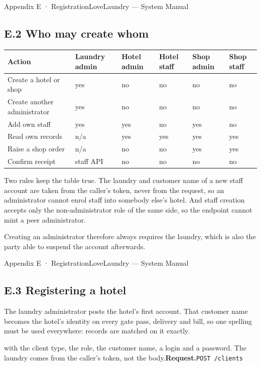 \documentclass[11pt,a4paper,oneside]{book}
\begin{document}
Appendix E · RegistrationLoveLaundry — System Manual

\subsection*{E.2 Who may create whom}
\begin{center}\small
\begin{tabularx}{\linewidth}{|X|X|X|X|X|X|}
\hline
\rowcolor{lightgrey}
\textbf{Action} & \textbf{Laundry admin} & \textbf{Hotel admin} & \textbf{Hotel staff} & \textbf{Shop admin} & \textbf{Shop staff} \\ \hline
Create a hotel or shop & yes & no & no & no & no \\ \hline
Create another administrator & yes & no & no & no & no \\ \hline
Add own staff & yes & yes & no & yes & no \\ \hline
Read own records & n/a & yes & yes & yes & yes \\ \hline
Raise a shop order & n/a & no & no & yes & yes \\ \hline
Confirm receipt & staff API & no & no & no & no \\ \hline
\end{tabularx}
\end{center}
Two rules keep the table true. The laundry and customer name of a new staff account are taken from the caller’s token, never from the request, so an administrator cannot enrol staff into somebody else’s hotel. And staff creation accepts only the non-administrator role of the same side, so the endpoint cannot mint a peer administrator.

Creating an administrator therefore always requires the laundry, which is also the party able to suspend the account afterwards.

Appendix E · RegistrationLoveLaundry — System Manual

\subsection*{E.3 Registering a hotel}
The laundry administrator posts the hotel’s first account. That customer name becomes the hotel’s identity on every gate pass, delivery and bill, so one spelling must be used everywhere: records are matched on it exactly.

with the client type, the role, the customer name, a login and a password. The laundry comes from the caller’s token, not the body.\textbf{Request.}\texttt{POST /clients}
\end{document}
